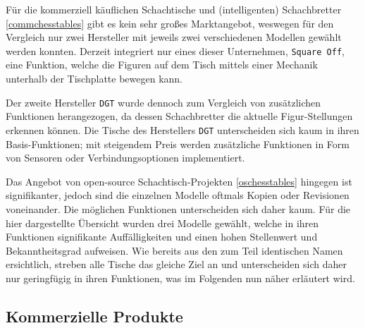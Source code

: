 Für die kommerziell käuflichen Schachtische und (intelligenten)
Schachbretter \ref{commchesstables} gibt es kein sehr großes
Marktangebot, weswegen für den Vergleich nur zwei Hersteller mit jeweils
zwei verschiedenen Modellen gewählt werden konnten. Derzeit integriert
nur eines dieser Unternehmen, \passthrough{\lstinline!Square Off!}, eine
Funktion, welche die Figuren auf dem Tisch mittels einer Mechanik
unterhalb der Tischplatte bewegen kann.

Der zweite Hersteller \passthrough{\lstinline!DGT!} wurde dennoch zum
Vergleich von zusätzlichen Funktionen herangezogen, da dessen
Schachbretter die aktuelle Figur-Stellungen erkennen können. Die Tische
des Herstellers \passthrough{\lstinline!DGT!} unterscheiden sich kaum in
ihren Basis-Funktionen; mit steigendem Preis werden zusätzliche
Funktionen in Form von Sensoren oder Verbindungsoptionen implementiert.

Das Angebot von open-source Schachtisch-Projekten \ref{oschesstables}
hingegen ist signifikanter, jedoch sind die einzelnen Modelle oftmals
Kopien oder Revisionen voneinander. Die möglichen Funktionen
unterscheiden sich daher kaum. Für die hier dargestellte Übersicht
wurden drei Modelle gewählt, welche in ihren Funktionen signifikante
Auffälligkeiten und einen hohen Stellenwert und Bekanntheitsgrad
aufweisen. Wie bereits aus den zum Teil identischen Namen ersichtlich,
streben alle Tische das gleiche Ziel an und unterscheiden sich daher nur
geringfügig in ihren Funktionen, was im Folgenden nun näher erläutert
wird.

\hypertarget{kommerzielle-produkte}{%
\subsection{Kommerzielle Produkte}\label{kommerzielle-produkte}}

\pagebreak

